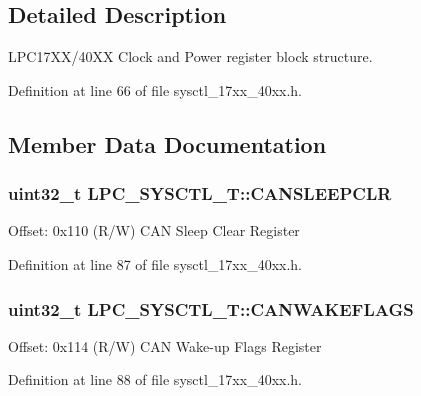 \subsection{Detailed Description}
L\+P\+C17\+X\+X/40\+XX Clock and Power register block structure. 

Definition at line 66 of file sysctl\+\_\+17xx\+\_\+40xx.\+h.



\subsection{Member Data Documentation}
\subsubsection[{\texorpdfstring{C\+A\+N\+S\+L\+E\+E\+P\+C\+LR}{CANSLEEPCLR}}]{ uint32\+\_\+t L\+P\+C\+\_\+\+S\+Y\+S\+C\+T\+L\+\_\+\+T\+::\+C\+A\+N\+S\+L\+E\+E\+P\+C\+LR}\hypertarget{structLPC__SYSCTL__T_aa6166dc2b9f99af318dfb44c259cff81}{}\label{structLPC__SYSCTL__T_aa6166dc2b9f99af318dfb44c259cff81}
Offset\+: 0x110 (R/W) C\+AN Sleep Clear Register 

Definition at line 87 of file sysctl\+\_\+17xx\+\_\+40xx.\+h.

\subsubsection[{\texorpdfstring{C\+A\+N\+W\+A\+K\+E\+F\+L\+A\+GS}{CANWAKEFLAGS}}]{ uint32\+\_\+t L\+P\+C\+\_\+\+S\+Y\+S\+C\+T\+L\+\_\+\+T\+::\+C\+A\+N\+W\+A\+K\+E\+F\+L\+A\+GS}\hypertarget{structLPC__SYSCTL__T_a4fee9b64e430f37988fe1fb566f6577e}{}\label{structLPC__SYSCTL__T_a4fee9b64e430f37988fe1fb566f6577e}
Offset\+: 0x114 (R/W) C\+AN Wake-\/up Flags Register 

Definition at line 88 of file sysctl\+\_\+17xx\+\_\+40xx.\+h.

